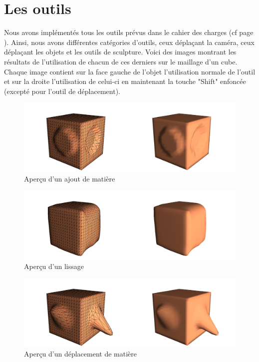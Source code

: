 \documentclass[a4paper]{memoir}
\begin{document}
		\section{Les outils}
			Nous avons implémentés tous les outils prévus dans le cahier des charges (cf page \pageref{tool-cdc}). Ainsi, nous avons différentes catégories 
			d'outils, ceux déplaçant la caméra, ceux déplaçant les objets et les outils de sculpture. Voici des images montrant les résultats de 
			l'utilisation de chacun de ces derniers sur le maillage d'un cube. Chaque image contient sur la face gauche de l'objet l'utilisation normale de 
			l'outil et sur la droite l'utilisation de celui-ci en maintenant la touche "Shift" enfoncée (excepté pour l'outil de déplacement).
			\begin{figure}[H]
				\vspace{-0,5cm} \hspace{-2cm} \includegraphics[scale=0.27]{img/add.png}
				\caption{Aperçu d'un ajout de matière}
			\end{figure}
			\begin{figure}[H]
				\vspace{-0,5cm} \hspace{-2cm} \includegraphics[scale=0.27]{img/smooth.png}
				\caption{Aperçu d'un lissage}
			\end{figure}
			\begin{figure}[H]
				\vspace{-0,5cm} \hspace{-2cm} \includegraphics[scale=0.27]{img/move.png}
				\caption{Aperçu d'un déplacement de matière}
			\end{figure}
\end{document}
